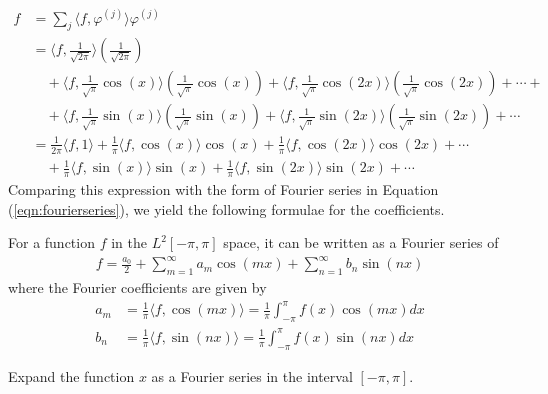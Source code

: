 \begin{align*}
f &= \sum_{j} \langle f, \varphi^{(j)} \rangle \varphi^{(j)} \\ 
&= \langle f, \frac{1}{\sqrt{2\pi}} \rangle (\frac{1}{\sqrt{2\pi}})\\
&\quad + \langle f, \frac{1}{\sqrt{\pi}}\cos(x) \rangle (\frac{1}{\sqrt{\pi}}\cos(x)) + \langle f, \frac{1}{\sqrt{\pi}}\cos(2x) \rangle (\frac{1}{\sqrt{\pi}}\cos(2x)) + \cdots + \\
&\quad + \langle f, \frac{1}{\sqrt{\pi}}\sin(x) \rangle (\frac{1}{\sqrt{\pi}}\sin(x)) + \langle f, \frac{1}{\sqrt{\pi}}\sin(2x) \rangle (\frac{1}{\sqrt{\pi}}\sin(2x)) + \cdots \\
&= \frac{1}{2\pi} \langle f, 1 \rangle + \frac{1}{\pi} \langle f, \cos(x) \rangle \cos(x) + \frac{1}{\pi} \langle f, \cos(2x) \rangle \cos(2x) + \cdots \\
&\quad + \frac{1}{\pi}\langle f, \sin(x) \rangle \sin(x) + \frac{1}{\pi}\langle f, \sin(2x) \rangle \sin(2x) + \cdots
\end{align*}
Comparing this expression with the form of Fourier series in Equation (\ref{eqn:fourierseries}), we yield the following formulae for the coefficients.
\begin{proper}
For a function $f$ in the $L^2[-\pi, \pi]$ space, it can be written as a Fourier series of
\begin{align*}
f = \frac{a_0}{2} + \sum_{m=1}^{\infty} a_m \cos(mx) + \sum_{n=1}^{\infty} b_n \sin(nx) 
\end{align*}
where the Fourier coefficients are given by
\begin{align}
a_m &= \frac{1}{\pi}\langle f, \cos(mx) \rangle = \frac{1}{\pi} \int_{-\pi}^{\pi} f(x)\cos(mx) dx \label{eqn:fouriera} \\
b_n &= \frac{1}{\pi}\langle f, \sin(nx) \rangle = \frac{1}{\pi} \int_{-\pi}^{\pi} f(x)\sin(nx) dx \label{eqn:fourierb}
\end{align}    
\end{proper}
\begin{exmp}
Expand the function $x$ as a Fourier series in the interval $[-\pi, \pi]$.
\end{exmp}
